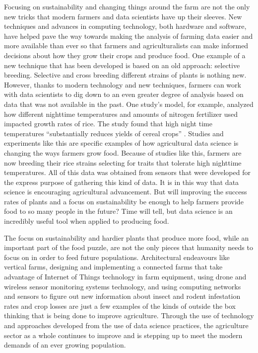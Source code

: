 \documentclass[sigconf]{acmart}
\begin{document}
Focusing on sustainability and changing things around the farm are not the only new tricks that modern farmers and data scientists have up their sleeves. New techniques and advances in computing technology, both hardware and software, have helped pave the way towards making the analysis of farming data easier and more available than ever so that farmers and agriculturalists can make informed decisions about how they grow their crops and produce food. One example of a new technique that has been developed is based on an old approach: selective breeding. Selective and cross breeding different strains of plants is nothing new. However, thanks to modern technology and new techniques, farmers can work with data scientists to dig down to an even greater degree of analysis based on data that was not available in the past. One study's model, for example, analyzed how different nighttime temperatures and amounts of nitrogen fertilizer used impacted growth rates of rice. The study found that high night time temperatures ``substantially reduces yields of cereal crops'' \cite{shi2017}. Studies and experiments like this are specific examples of how agricultural data science is changing the ways farmers grow food. Because of studies like this, farmers are now breeding their rice strains selecting for traits that tolerate high nighttime temperatures. All of this data was obtained from sensors that were developed for the express purpose of gathering this kind of data. It is in this way that data science is encouraging agricultural advancement. But will improving the success rates of plants and a focus on sustainability be enough to help farmers provide food to so many people in the future? Time will tell, but data science is an incredibly useful tool when applied to producing food.

The focus on sustainability and hardier plants that produce more food, while an important part of the food puzzle, are not the only pieces that humanity needs to focus on in order to feed future populations. Architectural endeavours like vertical farms, designing and implementing a connected farms that take advantage of Internet of Things technology in farm equipment, using drone and wireless sensor monitoring systems technology, and using computing networks and sensors to figure out new information about insect and rodent infestation rates and crop losses are just a few examples of the kinds of outside the box thinking that is being done to improve agriculture. Through the use of technology and approaches developed from the use of data science practices, the agriculture sector as a whole continues to improve and is stepping up to meet the modern demands of an ever growing population.
\end{document}
